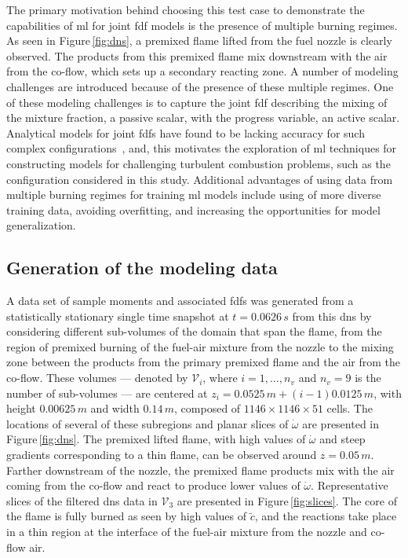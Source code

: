 \documentclass[review]{elsarticle}
\newcommand{\wt}[1]{\widetilde{#1}}
\begin{document}
The primary motivation behind choosing this test case to demonstrate
the capabilities of \gls{ml} for joint \gls{fdf} models is the
presence of multiple burning regimes. As seen in
Figure\,\ref{fig:dns}, a premixed flame lifted from the fuel nozzle is
clearly observed. The products from this premixed flame mix downstream
with the air from the co-flow, which sets up a secondary reacting
zone. A number of modeling challenges are introduced because of the
presence of these multiple regimes. One of these modeling challenges
is to capture the joint \gls{fdf} describing the mixing of the mixture
fraction, a passive scalar, with the progress variable, an active
scalar. Analytical models for joint \glspl{fdf} have found to be
lacking accuracy for such complex configurations~\cite{Ihme2008}, and,
this motivates the exploration of \gls{ml} techniques for constructing
models for challenging turbulent combustion problems, such as the
configuration considered in this study. Additional advantages of using
data from multiple burning regimes for training \gls{ml} models include
using of more diverse training data, avoiding overfitting, and
increasing the opportunities for model generalization.

\subsection{Generation of the modeling data}\label{sec:gen}

A data set of sample moments and associated \glspl{fdf} was generated
from a statistically stationary single time snapshot at
$t=0.0626\,\unit{s}$ from this \gls{dns} by considering different
sub-volumes of the domain that span the flame, from the region of
premixed burning of the fuel-air mixture from the nozzle to the mixing
zone between the products from the primary premixed flame and the air
from the co-flow. These volumes --- denoted by $\mathcal{V}_i$, where
$i=1, \dots, n_v$ and $n_v = 9$ is the number of sub-volumes --- are
centered at $z_i = 0.0525\,\unit{m} + (i-1) 0.0125 \,\unit{m}$, with
height $0.00625\,\unit{m}$ and width $0.14\,\unit{m}$, composed of
$1146 \times 1146 \times 51$ cells. The locations of several of these
subregions and planar slices of $\dot{\omega}$ are presented in
Figure\,\ref{fig:dns}. The premixed lifted flame, with high values of
$\dot{\omega}$ and steep gradients corresponding to a thin flame, can
be observed around $z=0.05\,\unit{m}$. Farther downstream of the
nozzle, the premixed flame products mix with the air coming from the
co-flow and react to produce lower values of
$\dot{\omega}$. Representative slices of the filtered \gls{dns} data
in $\mathcal{V}_3$ are presented in Figure\,\ref{fig:slices}. The core
of the flame is fully burned as seen by high values of $\wt{c}$, and
the reactions take place in a thin region at the interface of the
fuel-air mixture from the nozzle and co-flow air.
\end{document}
